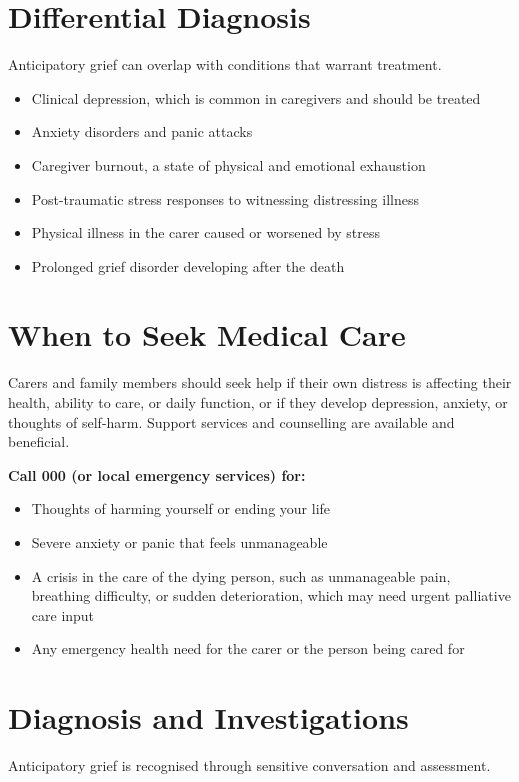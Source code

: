 \section*{Differential Diagnosis}
Anticipatory grief can overlap with conditions that warrant treatment.

\begin{itemize}
    \item Clinical depression, which is common in caregivers and should be treated
    \item Anxiety disorders and panic attacks
    \item Caregiver burnout, a state of physical and emotional exhaustion
    \item Post-traumatic stress responses to witnessing distressing illness
    \item Physical illness in the carer caused or worsened by stress
    \item Prolonged grief disorder developing after the death
\end{itemize}

\section*{When to Seek Medical Care}
Carers and family members should seek help if their own distress is affecting their health, ability to care, or daily function, or if they develop depression, anxiety, or thoughts of self-harm. Support services and counselling are available and beneficial.

\textbf{Call 000 (or local emergency services) for:}
\begin{itemize}
    \item Thoughts of harming yourself or ending your life
    \item Severe anxiety or panic that feels unmanageable
    \item A crisis in the care of the dying person, such as unmanageable pain, breathing difficulty, or sudden deterioration, which may need urgent palliative care input
    \item Any emergency health need for the carer or the person being cared for
\end{itemize}

\section*{Diagnosis and Investigations}
Anticipatory grief is recognised through sensitive conversation and assessment.

